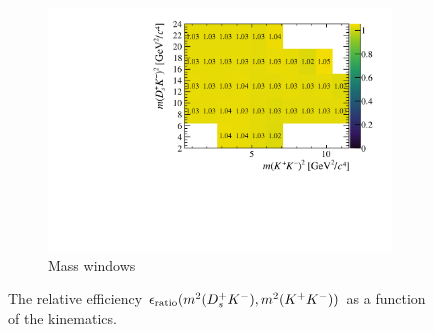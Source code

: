 \begin{figure}[!h]
\begin{subfigure}[t]{0.40\textwidth}
        \includegraphics[width=1.0\textwidth]{figs/B2DsKK/Relative_Eff_mass_All.pdf}
        \caption{Mass windows}
        \label{fig:B2DsKK_releff_masswindows}
    \end{subfigure}
    \caption{The relative efficiency $\epsilon_{\text{ratio}}(m^{2}({{D}^+_{s}}{{K}^-}),m^{2}({{K}^+}{{K}^-}))$ as a function of the \decay{\Bp}{\Dsp\Kp\Km} kinematics.}
   \label{fig:B2DsKK_dalitz_eff_one}
\end{figure}





